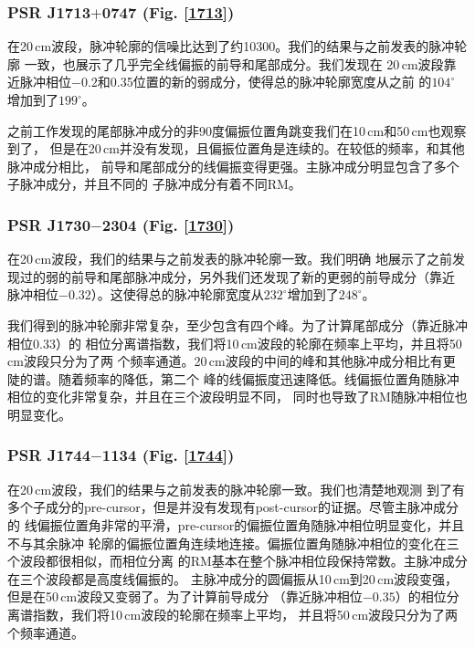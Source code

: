 \subsubsection{PSR J1713$+$0747 (Fig. \ref{1713})}

在20\,cm波段，脉冲轮廓的信噪比达到了约10300。我们的结果与之前发表的脉冲轮廓
一致\supercite{Ord04,Yan11a}，也展示了几乎完全线偏振的前导和尾部成分。我们发现在
20\,cm波段靠近脉冲相位$-0.2$和0.35位置的新的弱成分，使得总的脉冲轮廓宽度从之前
的$104^{\circ}$增加到了$199^{\circ}$。

之前工作发现的尾部脉冲成分的非90度偏振位置角跳变我们在10\,cm和50\,cm也观察到了，
但是在20\,cm并没有发现，且偏振位置角是连续的。在较低的频率，和其他脉冲成分相比，
前导和尾部成分的线偏振变得更强。主脉冲成分明显包含了多个子脉冲成分，并且不同的
子脉冲成分有着不同RM。

\subsubsection{PSR J1730$-$2304 (Fig. \ref{1730})}

在20\,cm波段，我们的结果与之前发表的脉冲轮廓一致\supercite{Ord04,Yan11a}。我们明确
地展示了之前发现过的弱的前导和尾部脉冲成分，另外我们还发现了新的更弱的前导成分（靠近
脉冲相位$-0.32$）。这使得总的脉冲轮廓宽度从$232^{\circ}$增加到了$248^{\circ}$。

我们得到的脉冲轮廓非常复杂，至少包含有四个峰。为了计算尾部成分（靠近脉冲相位0.33）的
相位分离谱指数，我们将10\,cm波段的轮廓在频率上平均，并且将50\,cm波段只分为了两
个频率通道。20\,cm波段的中间的峰和其他脉冲成分相比有更陡的谱。随着频率的降低，第二个
峰的线偏振度迅速降低。线偏振位置角随脉冲相位的变化非常复杂，并且在三个波段明显不同，
同时也导致了RM随脉冲相位也明显变化。

\subsubsection{PSR J1744$-$1134 (Fig. \ref{1744})}

在20\,cm波段，我们的结果与之前发表的脉冲轮廓一致\supercite{Yan11a}。我们也清楚地观测
到了有多个子成分的pre-cursor，但是并没有发现有post-cursor的证据。尽管主脉冲成分的
线偏振位置角非常的平滑，pre-cursor的偏振位置角随脉冲相位明显变化，并且不与其余脉冲
轮廓的偏振位置角连续地连接。偏振位置角随脉冲相位的变化在三个波段都很相似，而相位分离
的RM基本在整个脉冲相位段保持常数。主脉冲成分在三个波段都是高度线偏振的。
主脉冲成分的圆偏振从10\,cm到20\,cm波段变强，但是在50\,cm波段又变弱了。为了计算前导成分
（靠近脉冲相位$-0.35$）的相位分离谱指数，我们将10\,cm波段的轮廓在频率上平均，
并且将50\,cm波段只分为了两个频率通道。

